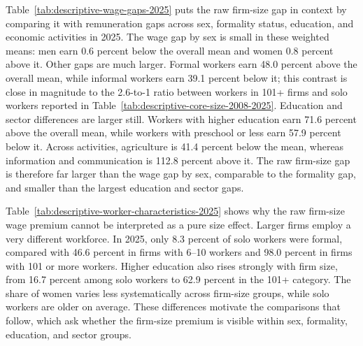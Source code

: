 Table~\ref{tab:descriptive-wage-gaps-2025} puts the raw firm-size gap in
context by comparing it with remuneration gaps across sex, formality status,
education, and economic activities in 2025. The wage gap by sex is small in
these weighted means: men earn 0.6 percent below the overall mean and women
0.8 percent above it. Other gaps are much larger. Formal workers earn 48.0
percent above the overall mean, while informal workers earn 39.1 percent below
it; this contrast is close in magnitude to the 2.6-to-1 ratio between workers
in 101+ firms and solo workers reported in
Table~\ref{tab:descriptive-core-size-2008-2025}. Education and sector
differences are larger still. Workers with higher education earn 71.6 percent
above the overall mean, while workers with preschool or less earn 57.9 percent
below it. Across activities, agriculture is 41.4 percent below the mean,
whereas information and communication is 112.8 percent above it. The raw
firm-size gap is therefore far larger than the wage gap by sex, comparable to
the formality gap, and smaller than the largest education and sector gaps.



Table~\ref{tab:descriptive-worker-characteristics-2025} shows why the raw firm-size wage premium cannot be interpreted as a pure size effect. Larger firms employ a very different workforce. In 2025, only 8.3 percent of solo workers were formal, compared with 46.6 percent in firms with 6--10 workers and 98.0 percent in firms with 101 or more workers. Higher education also rises strongly with firm size, from 16.7 percent among solo workers to 62.9 percent in the 101+ category. The share of women varies less systematically across firm-size groups, while solo workers are older on average. These differences motivate the comparisons that follow, which ask whether the firm-size premium is visible within sex, formality, education, and sector groups.




